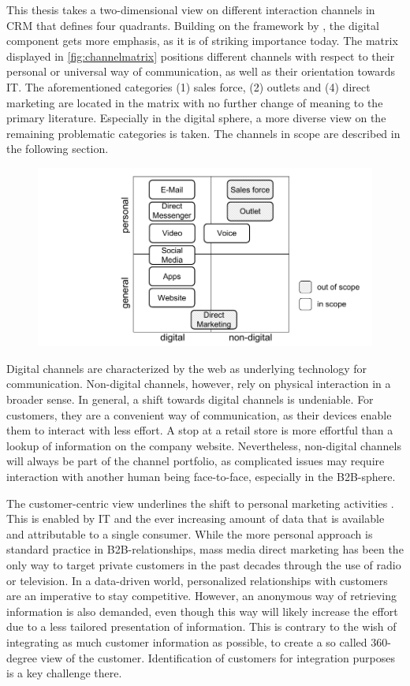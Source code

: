 		This thesis takes a two-dimensional view on different interaction channels in CRM that defines four quadrants. Building on the framework by \cite{paynefrow2005}, the digital component gets more emphasis, as it is of striking importance today. The matrix displayed in \Fig \ref{fig:channelmatrix} positions different channels with respect to their personal or universal way of communication, as well as their orientation towards IT. The aforementioned categories (1) sales force, (2) outlets and (4) direct marketing are located in the matrix with no further change of meaning to the primary literature. Especially in the digital sphere, a more diverse view on the remaining problematic categories is taken. The channels in scope are described in the following section. 
		
			\begin{figure}[caption={Channel Matrix}, label={fig:channelmatrix}]
			{	\includegraphics[width=.8\textwidth]{figures/channelmatrix.pdf}}
		\end{figure}
		
		Digital channels are characterized by the web as underlying technology for communication. Non-digital channels, however, rely on physical interaction in a broader sense. In general, a shift towards digital channels is undeniable. For customers, they are a convenient way of communication, as their devices enable them to interact with less effort. A stop at a retail store is more effortful than a lookup of information on the company website. Nevertheless, non-digital channels will always be part of the channel portfolio, as complicated issues may require interaction with another human being face-to-face, especially in the B2B-sphere. 
		
		The customer-centric view underlines the shift to personal marketing activities \citep{peppers}. This is enabled by IT and the ever increasing amount of data that is available and attributable to a single consumer. While the more personal approach is standard practice in B2B-relationships, mass media direct marketing has been the only way to target private customers in the past decades through the use of radio or television. In a data-driven world, personalized relationships with customers are an imperative to stay competitive. However, an anonymous way of retrieving information is also demanded, even though this way will likely increase the effort due to a less tailored presentation of information. This is contrary to the wish of integrating as much customer information as possible, to create a so called 360-degree view of the customer. Identification of customers for integration purposes is a key challenge there. 
		
